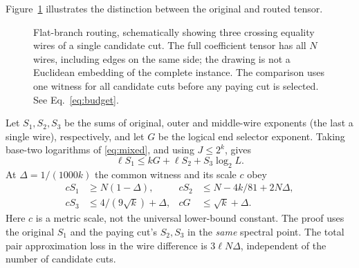 \documentclass[11pt,letterpaper]{article}
\theoremstyle{definition}\newtheorem{definition}[theorem]{Definition}\newtheorem{example}[theorem]{Example}
\theoremstyle{remark}\newtheorem{remark}[theorem]{Remark}
\begin{document}
Figure~\ref{fig:flat-routing} illustrates the distinction between the original and routed tensor.
\begin{figure}[!htbp]
\centering
{}
\caption{Flat-branch routing, schematically showing three crossing equality wires of a single candidate cut. The full coefficient tensor has all $N$ wires, including edges on the same side; the drawing is not a Euclidean embedding of the complete instance. The comparison uses one witness for all candidate cuts before any paying cut is selected. See Eq.~\eqref{eq:budget}.}\label{fig:flat-routing}
\end{figure}

Let $S_1,S_2,S_3$ be the sums of original, outer and middle-wire exponents (the last a single wire), respectively, and let $G$ be the logical end selector exponent. Taking base-two logarithms of \eqref{eq:mixed}, and using $J\le2^k$, gives
\begin{equation}\label{eq:budget}
 \ell S_1\le kG+\ell S_2+S_3\log_2L.
\end{equation}
At $\Delta=1/(1000k)$ the common witness and its scale $c$ obey
\begin{align}
 cS_1&\ge N(1-\Delta), &cS_2&\le N-4k/81+2N\Delta,\label{eq:pricebounds}\\
 cS_3&\le4/(9\sqrt k)+\Delta, &cG&\le\sqrt k+\Delta.
\end{align}
Here $c$ is a metric scale, not the universal lower-bound constant. The proof uses the original $S_1$ and the paying cut's $S_2,S_3$ in the \emph{same} spectral point. The total pair approximation loss in the wire difference is $3\ell N\Delta$, independent of the number of candidate cuts.
\end{document}
